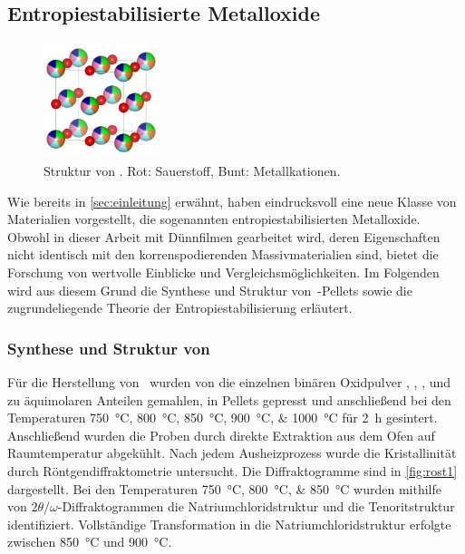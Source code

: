 \subsection{Entropiestabilisierte Metalloxide}\label{subsec:hochentropische-metalloxide}
\begin{figure}
    \centering
    \includegraphics[width=0.3\textwidth]{../assets/theorie/heo}
    \caption{Struktur von \heo. Rot: Sauerstoff, Bunt: Metallkationen.}
    \label{fig:heo}
\end{figure}
Wie bereits in \cref{sec:einleitung} erwähnt, haben  eindrucksvoll eine neue Klasse von
Materialien vorgestellt, die sogenannten entropiestabilisierten Metalloxide.
Obwohl in dieser Arbeit mit Dünnfilmen gearbeitet wird, deren Eigenschaften nicht identisch mit den korrenspodierenden
Massivmaterialien sind, bietet die Forschung von  wertvolle Einblicke und
Vergleichsmöglichkeiten.
Im Folgenden wird aus diesem Grund die Synthese und Struktur von \heo\,-Pellets
sowie die zugrundeliegende Theorie
der Entropiestabilisierung erläutert.

\subsubsection{Synthese und Struktur von \texorpdfstring{\heo}{MgCoNiCuZnO}}\label{subsubsec:heo}
Für die Herstellung von \heo\ wurden von  die einzelnen binären Oxidpulver , ,
,  und  zu äquimolaren Anteilen gemahlen, in Pellets gepresst und anschließend bei den
Temperaturen \qtylist{750;800;850;900;1000}{\celsius} für \qty{2}{\hour} gesintert.
Anschließend wurden die Proben durch direkte Extraktion aus dem Ofen auf Raumtemperatur abgekühlt.
Nach jedem Ausheizprozess wurde die Kristallinität durch Röntgendiffraktometrie untersucht.
Die Diffraktogramme sind in \cref{fig:rost1} dargestellt.
Bei den Temperaturen \qtylist{750;800;850}{\celsius} wurden mithilfe von $2\theta/\omega$-Diffraktogrammen die
Natriumchloridstruktur und die Tenoritstruktur identifiziert.
Vollständige Transformation in die Natriumchloridstruktur erfolgte zwischen \qty{850}{\celsius} und \qty{900}{\celsius}.

